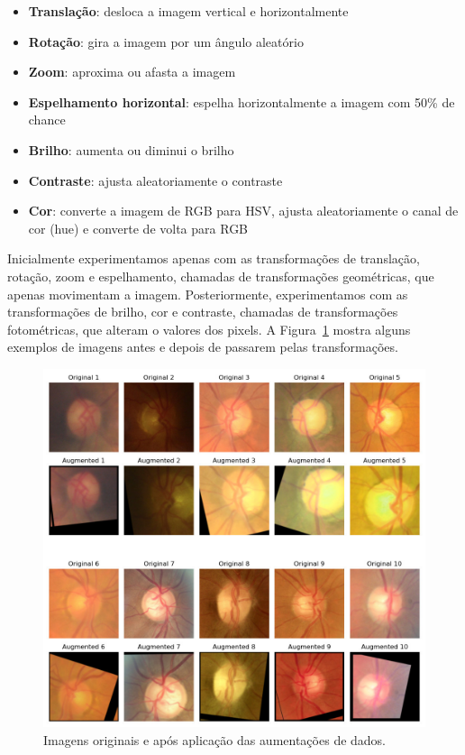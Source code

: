 \documentclass[12pt]{article}
\begin{document}
\begin{itemize}[noitemsep]
    \item \textbf{Translação}: desloca a imagem vertical e horizontalmente
    \item \textbf{Rotação}: gira a imagem por um ângulo aleatório
    \item \textbf{Zoom}: aproxima ou afasta a imagem
    \item \textbf{Espelhamento horizontal}: espelha horizontalmente a imagem com 50\% de chance
    \item \textbf{Brilho}: aumenta ou diminui o brilho
    \item \textbf{Contraste}: ajusta aleatoriamente o contraste
    \item \textbf{Cor}: converte a imagem de RGB para HSV, ajusta aleatoriamente o canal de cor (hue) e converte de volta para RGB
\end{itemize}

Inicialmente experimentamos apenas com as transformações de translação, rotação, zoom e espelhamento, chamadas de transformações geométricas, que apenas movimentam a imagem. Posteriormente, experimentamos com as transformações de brilho, cor e contraste, chamadas de transformações fotométricas, que alteram o valores dos pixels. A Figura~\ref{fig:augmentations} mostra alguns exemplos de imagens antes e depois de passarem pelas transformações.

\begin{figure}[htb]
 \centering
 \includegraphics[width=1.0\textwidth]{images/augmentations.jpg}
 \caption{Imagens originais e após aplicação das aumentações de dados.}
 \label{fig:augmentations}
\end{figure}
\end{document}
